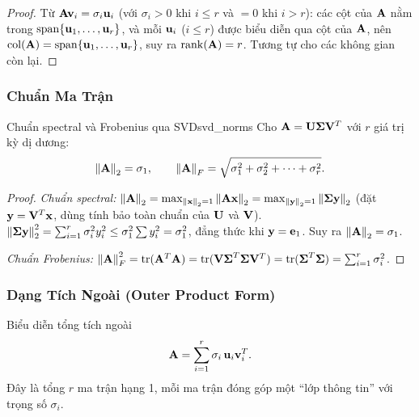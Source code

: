 \begin{proof}
Từ $\mathbf{A}\mathbf{v}_i = \sigma_i\mathbf{u}_i$ (với $\sigma_i > 0$ khi $i \leq r$ và
$= 0$ khi $i > r$): các cột của $\mathbf{A}$ nằm trong $\operatorname{span}\{\mathbf{u}_1,\ldots,\mathbf{u}_r\}$,
và mỗi $\mathbf{u}_i$ ($i \leq r$) được biểu diễn qua cột của $\mathbf{A}$, nên
$\operatorname{col}(\mathbf{A}) = \operatorname{span}\{\mathbf{u}_1,\ldots,\mathbf{u}_r\}$, suy ra $\operatorname{rank}(\mathbf{A}) = r$.
Tương tự cho các không gian còn lại.
\end{proof}

\subsubsection{Chuẩn Ma Trận}

\begin{mythm}{Chuẩn spectral và Frobenius qua SVD}{svd_norms}
Cho $\mathbf{A} = \mathbf{U}\boldsymbol{\Sigma}\mathbf{V}^T$ với $r$ giá trị kỳ dị dương:
\[
    \left\lVert\mathbf{A}\right\rVert_2 = \sigma_1,
    \qquad
    \left\lVert\mathbf{A}\right\rVert_F = \sqrt{\sigma_1^2 + \sigma_2^2 + \cdots + \sigma_r^2}.
\]
\end{mythm}

\begin{proof}
\textit{Chuẩn spectral:}
$\left\lVert\mathbf{A}\right\rVert_2 = \max_{\left\lVert\mathbf{x}\right\rVert_2=1}\left\lVert\mathbf{A}\mathbf{x}\right\rVert_2 =
\max_{\left\lVert\mathbf{y}\right\rVert_2=1}\left\lVert\boldsymbol{\Sigma}\mathbf{y}\right\rVert_2$
(đặt $\mathbf{y} = \mathbf{V}^T\mathbf{x}$, dùng tính bảo toàn chuẩn của $\mathbf{U}$ và $\mathbf{V}$).
$\left\lVert\boldsymbol{\Sigma}\mathbf{y}\right\rVert_2^2 = \sum_{i=1}^r \sigma_i^2 y_i^2 \leq \sigma_1^2\sum y_i^2
= \sigma_1^2$, đẳng thức khi $\mathbf{y} = \mathbf{e}_1$. Suy ra $\left\lVert\mathbf{A}\right\rVert_2 = \sigma_1$.

\textit{Chuẩn Frobenius:}
$\left\lVert\mathbf{A}\right\rVert_F^2 = \operatorname{tr}(\mathbf{A}^T\mathbf{A}) =
\operatorname{tr}(\mathbf{V}\boldsymbol{\Sigma}^T\boldsymbol{\Sigma}\mathbf{V}^T) =
\operatorname{tr}(\boldsymbol{\Sigma}^T\boldsymbol{\Sigma}) = \sum_{i=1}^r \sigma_i^2$.
\end{proof}

\subsubsection{Dạng Tích Ngoài (Outer Product Form)}

\begin{mythm}{Biểu diễn tổng tích ngoài}{}
\[
    \mathbf{A} = \sum_{i=1}^{r} \sigma_i\, \mathbf{u}_i\mathbf{v}_i^T.
\]
Đây là tổng $r$ ma trận hạng 1, mỗi ma trận đóng góp một ``lớp thông tin'' với trọng
số $\sigma_i$.
\end{mythm}

